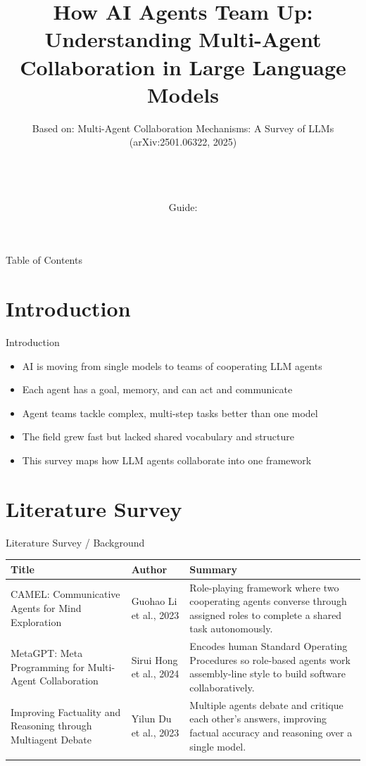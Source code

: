\documentclass[10pt]{beamer}
\title[B.Tech Seminar]{How AI Agents Team Up: Understanding Multi-Agent Collaboration in Large Language Models}
\subtitle{Based on: Multi-Agent Collaboration Mechanisms: A Survey of LLMs (arXiv:2501.06322, 2025)}
\author[\studentname\ (\shortinst)]{\studentname \\ \small \rollno \\ \small \rollclass \\ \small Guide: \guidename}
\institute[]{\deptname \\ \collegename}
\date{\seminardate}
\begin{document}
\begin{frame}[plain]
  \titlepage
\end{frame}

\begin{frame}{Table of Contents}
  \tableofcontents
\end{frame}

\section{Introduction}
\begin{frame}{Introduction}
\begin{itemize}
  \item AI is moving from single models to teams of cooperating LLM agents
  \item Each agent has a goal, memory, and can act and communicate
  \item Agent teams tackle complex, multi-step tasks better than one model
  \item The field grew fast but lacked shared vocabulary and structure
  \item This survey maps how LLM agents collaborate into one framework
\end{itemize}
\end{frame}

\section{Literature Survey}
\begin{frame}{Literature Survey / Background}
  \small
  \begin{tabular}{@{}p{2.7cm}p{2.3cm}p{5.6cm}@{}}
    \toprule
    \textbf{Title} & \textbf{Author} & \textbf{Summary} \\
    \midrule
    CAMEL: Communicative Agents for Mind Exploration & Guohao Li et al., 2023 & Role-playing framework where two cooperating agents converse through assigned roles to complete a shared task autonomously. \\
    \addlinespace
    MetaGPT: Meta Programming for Multi-Agent Collaboration & Sirui Hong et al., 2024 & Encodes human Standard Operating Procedures so role-based agents work assembly-line style to build software collaboratively. \\
    \addlinespace
    Improving Factuality and Reasoning through Multiagent Debate & Yilun Du et al., 2023 & Multiple agents debate and critique each other's answers, improving factual accuracy and reasoning over a single model. \\
    \addlinespace
    \bottomrule
  \end{tabular}
\end{frame}
\end{document}
